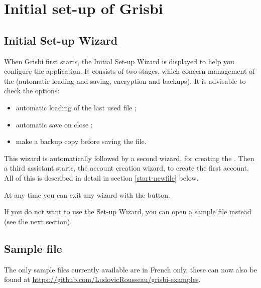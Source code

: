 

\chapter{Initial set-up of Grisbi\label{start}}


\section{Initial Set-up Wizard\label{start-first}}


When Grisbi first starts, the Initial Set-up Wizard is displayed to
help you configure the application. It consists of two stages, which concern
management of the   (automatic loading and saving,
encryption and backups).
It is advisable to check the options:

\begin{itemize}
 \item automatic loading of the last used file  ;
 \item automatic save on close ;
 \item make a backup copy before saving the file.
\end{itemize}

This wizard is automatically followed by a second wizard, for creating the  . Then a third assistant starts, the account creation wizard, to create the first account. All of this is described in detail in section \ref{start-newfile}  below.

At any time you can exit any wizard with the  button.

If you do not want to use the Set-up Wizard, you can open a sample file instead (see the next section).

\section{Sample file\label{start-example}}
 The only sample files currently available are in French only, these can now also be found at \url{https://github.com/LudovicRousseau/grisbi-examples}.

